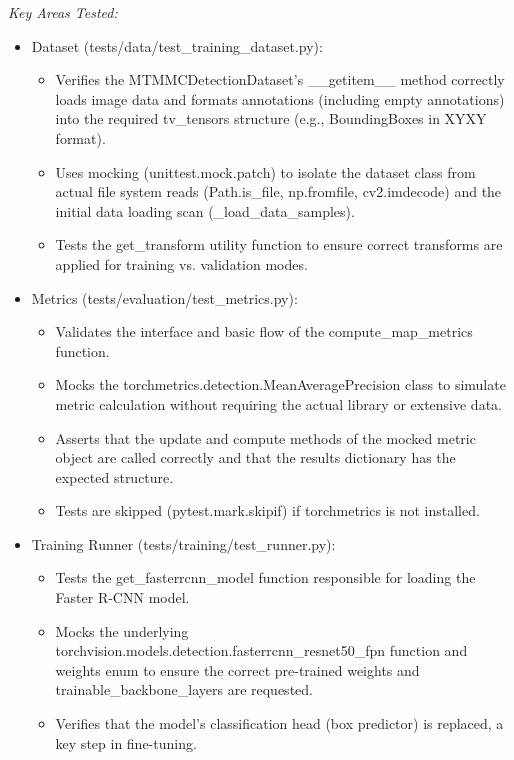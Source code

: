 \textit{Key Areas Tested:}
\begin{itemize}
    \item Dataset (tests/data/test\_training\_dataset.py):
    \begin{itemize}
        \item Verifies the MTMMCDetectionDataset's \_\_getitem\_\_ method correctly loads image data and formats annotations (including empty annotations) into the required tv\_tensors structure (e.g., BoundingBoxes in XYXY format).
        \item Uses mocking (unittest.mock.patch) to isolate the dataset class from actual file system reads (Path.is\_file, np.fromfile, cv2.imdecode) and the initial data loading scan (\_load\_data\_samples).
        \item Tests the get\_transform utility function to ensure correct transforms are applied for training vs. validation modes.
    \end{itemize}
    \item Metrics (tests/evaluation/test\_metrics.py):
    \begin{itemize}
        \item Validates the interface and basic flow of the compute\_map\_metrics function.
        \item Mocks the torchmetrics.detection.MeanAveragePrecision class to simulate metric calculation without requiring the actual library or extensive data.
        \item Asserts that the update and compute methods of the mocked metric object are called correctly and that the results dictionary has the expected structure.
        \item Tests are skipped (pytest.mark.skipif) if torchmetrics is not installed.
    \end{itemize}
    \item Training Runner (tests/training/test\_runner.py):
    \begin{itemize}
        \item Tests the get\_fasterrcnn\_model function responsible for loading the Faster R-CNN model.
        \item Mocks the underlying torchvision.models.detection.fasterrcnn\_resnet50\_fpn function and weights enum to ensure the correct pre-trained weights and trainable\_backbone\_layers are requested.
        \item Verifies that the model's classification head (box predictor) is replaced, a key step in fine-tuning.
    \end{itemize}

\end{itemize}
